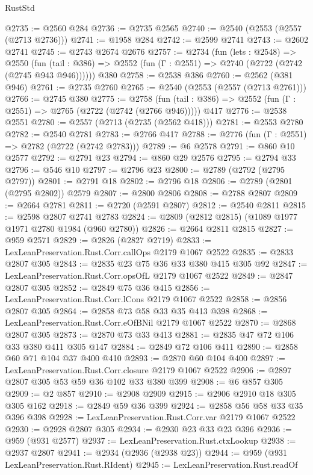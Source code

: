 \begin{lexlean}{RustStd}
\begin{coremodule}
@2735 := @2560 @284
@2736 := @2735 @2565
@2740 := @2540 (@2553 (@2557 (@2713 @2736)))
@2741 := @1958 @284
@2742 := @2599 @2741
@2743 := @2602 @2741
@2745 := @2743 @2674 @2676
@2757 := @2734
    (fun (lets : @2548) =>
    @2550 (fun (tail : @386) => @2552 (fun (Γ : @2551) => @2740 (@2722 (@2742 (@2745 @943 @946))))))
    @380
@2758 := @2538 @386
@2760 := @2562 (@381 @946)
@2761 := @2735 @2760
@2765 := @2540 (@2553 (@2557 (@2713 @2761)))
@2766 := @2745 @380
@2775 := @2758
    (fun (tail : @386) => @2552 (fun (Γ : @2551) => @2765 (@2722 (@2742 (@2766 @946)))))
    @417
@2776 := @2538 @2551
@2780 := @2557 (@2713 (@2735 (@2562 @418)))
@2781 := @2553 @2780
@2782 := @2540 @2781
@2783 := @2766 @417
@2788 := @2776 (fun (Γ : @2551) => @2782 (@2722 (@2742 @2783)))
@2789 := @6 @2578
@2791 := @860 @10 @2577
@2792 := @2791 @23
@2794 := @860 @29 @2576
@2795 := @2794 @33
@2796 := @546 @10
@2797 := @2796 @23
@2800 := @2789 (@2792 (@2795 @2797))
@2801 := @2791 @18
@2802 := @2796 @18
@2806 := @2789 (@2801 (@2795 @2802)) @2579
@2807 := @2800 @2806
@2808 := @2788 @2807
@2809 := @2664 @2781
@2811 := @2720 (@2591 @2807)
@2812 := @2540 @2811
@2815 := @2598 @2807 @2741 @2783
@2824 := @2809 (@2812 @2815) (@1089 @1977 @1971 @2780 @1984 (@960 @2780))
@2826 := @2664 @2811 @2815
@2827 := @959 @2571
@2829 := @2826 (@2827 @2719)
@2833 := LexLeanPreservation.Rust.Corr.callOps @2179 @1067 @2522
@2835 := @2833 @2807 @305
@2843 := @2835 @23 @75 @36 @33 @380 @415 @305 @92
@2847 := LexLeanPreservation.Rust.Corr.opsOfL @2179 @1067 @2522
@2849 := @2847 @2807 @305
@2852 := @2849 @75 @36 @415
@2856 := LexLeanPreservation.Rust.Corr.lCons @2179 @1067 @2522
@2858 := @2856 @2807 @305
@2864 := @2858 @73 @58 @33 @35 @413 @398
@2868 := LexLeanPreservation.Rust.Corr.eOfBNil @2179 @1067 @2522
@2870 := @2868 @2807 @305
@2873 := @2870 @73 @33 @413
@2881 := @2835 @47 @72 @106 @33 @380 @411 @305 @147
@2884 := @2849 @72 @106 @411
@2890 := @2858 @60 @71 @104 @37 @400 @410
@2893 := @2870 @60 @104 @400
@2897 := LexLeanPreservation.Rust.Corr.closure @2179 @1067 @2522
@2906 := @2897 @2807 @305 @53 @59 @36 @102 @33 @380 @399
@2908 := @6 @857 @305
@2909 := @2 @857
@2910 := @2908 @2909
@2915 := @2906 @2910 @18 @305 @305 @162
@2918 := @2849 @59 @36 @399
@2924 := @2858 @56 @58 @33 @35 @396 @398
@2928 := LexLeanPreservation.Rust.Corr.var @2179 @1067 @2522
@2930 := @2928 @2807 @305
@2934 := @2930 @23 @33 @23 @396
@2936 := @959 (@931 @2577)
@2937 := LexLeanPreservation.Rust.ctxLookup
@2938 := @2937 @2807
@2941 := @2934 (@2936 (@2938 @23))
@2944 := @959 (@931 LexLeanPreservation.Rust.RIdent)
@2945 := LexLeanPreservation.Rust.readOf

\end{coremodule}
\end{lexlean}
